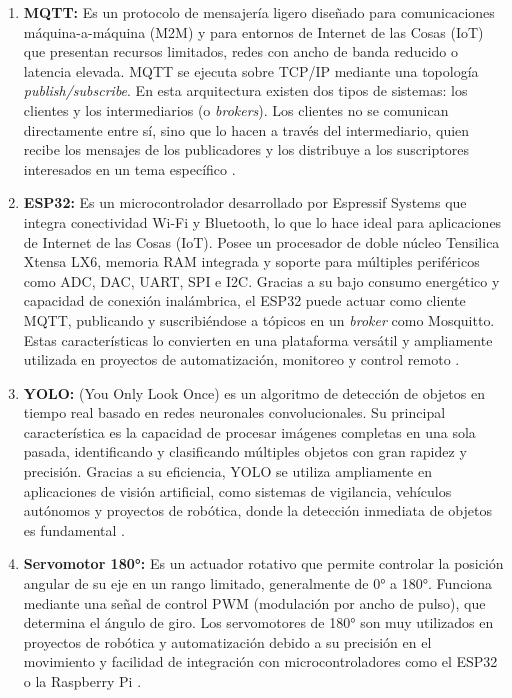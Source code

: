 \documentclass{article}
\begin{document}
\begin{enumerate}
    \item \textbf{MQTT: } Es un protocolo de mensajería ligero diseñado para comunicaciones máquina-a-máquina (M2M) y para entornos de Internet de las Cosas (IoT) que presentan recursos limitados, redes con ancho de banda reducido o latencia elevada. MQTT se ejecuta sobre TCP/IP mediante una topología \textit{publish/subscribe}. En esta arquitectura existen dos tipos de sistemas: los clientes y los intermediarios (o \textit{brokers}). Los clientes no se comunican directamente entre sí, sino que lo hacen a través del intermediario, quien recibe los mensajes de los publicadores y los distribuye a los suscriptores interesados en un tema específico \cite{mqtt_org_2025}.

    \item \textbf{ESP32: } Es un microcontrolador desarrollado por Espressif Systems que integra conectividad Wi-Fi y Bluetooth, lo que lo hace ideal para aplicaciones de Internet de las Cosas (IoT). Posee un procesador de doble núcleo Tensilica Xtensa LX6, memoria RAM integrada y soporte para múltiples periféricos como ADC, DAC, UART, SPI e I2C. 
    Gracias a su bajo consumo energético y capacidad de conexión inalámbrica, el ESP32 puede actuar como cliente MQTT, publicando y suscribiéndose a tópicos en un \textit{broker} como Mosquitto. Estas características lo convierten en una plataforma versátil y ampliamente utilizada en proyectos de automatización, monitoreo y control remoto \cite{esp32}.

    \item \textbf{YOLO: } (You Only Look Once) es un algoritmo de detección de objetos en tiempo real basado en redes neuronales convolucionales. Su principal característica es la capacidad de procesar imágenes completas en una sola pasada, identificando y clasificando múltiples objetos con gran rapidez y precisión. Gracias a su eficiencia, YOLO se utiliza ampliamente en aplicaciones de visión artificial, como sistemas de vigilancia, vehículos autónomos y proyectos de robótica, donde la detección inmediata de objetos es fundamental \cite{datacamp_yolo_2025}.

    \item \textbf{Servomotor 180°: } Es un actuador rotativo que permite controlar la posición angular de su eje en un rango limitado, generalmente de 0° a 180°. Funciona mediante una señal de control PWM (modulación por ancho de pulso), que determina el ángulo de giro. Los servomotores de 180° son muy utilizados en proyectos de robótica y automatización debido a su precisión en el movimiento y facilidad de integración con microcontroladores como el ESP32 o la Raspberry Pi \cite{makerelectronico_servomotor_2025}.


\end{enumerate}
\end{document}
